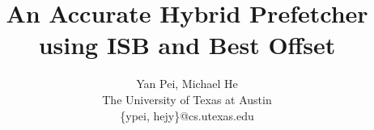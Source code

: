 \documentclass[a4paper,keeplastbox,twoside,10pt]{report}
\begin{document}
\title{\LARGE An Accurate Hybrid Prefetcher using ISB and Best Offset}
\author{Yan Pei, Michael He\\The University of Texas at Austin\\\{ypei, hejy\}@cs.utexas.edu}

\maketitle


\tableofcontents
\newpage

\newpage

\newpage

\newpage

\newpage

\newpage

\newpage

\newpage

\newpage



\newpage


\end{document}

